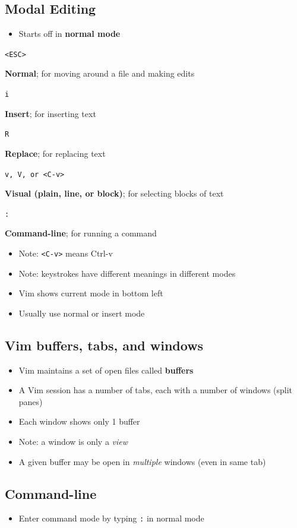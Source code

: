 \documentclass[letterpaper,12pt]{article}
\newcommand*{\lstitem}[1]{
  \setbox0\hbox{\lstinline{#1}}
  \item[\usebox0]
}
\begin{document}
\subsection{Modal Editing}
\begin{itemize}
 \item Starts off in \textbf{normal mode}
\end{itemize}

\begin{description}
 \lstitem{<ESC>} \textbf{Normal}; for moving around a file and making edits
 \lstitem{i} \textbf{Insert}; for inserting text
 \lstitem{R} \textbf{Replace}; for replacing text
 \lstitem{v, V, or <C-v>} \textbf{Visual (plain, line, or block)}; for selecting blocks of text
 \lstitem{:} \textbf{Command-line}; for running a command
\end{description}


\begin{itemize}
 \item Note: \lstinline{<C-v>} means Ctrl-v
 \item Note: keystrokes have different meanings in different modes
 \item Vim shows current mode in bottom left
 \item Usually use normal or insert mode
\end{itemize}

\subsection{Vim buffers, tabs, and windows}
\begin{itemize}
 \item Vim maintains a set of open files called \textbf{buffers}
 \item A Vim session has a number of tabs, each with a number of windows (split panes)
 \item Each window shows only 1 buffer
 \item Note: a window is only a \textit{view}
 \item A given buffer may be open in \textit{multiple} windows (even in same tab)
\end{itemize}

\subsection{Command-line}
\begin{itemize}
 \item Enter command mode by typing \lstinline{:} in normal mode
\end{itemize}
\end{document}
